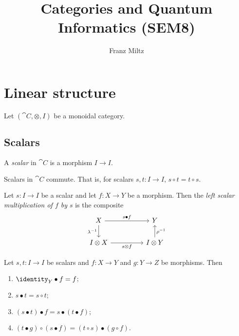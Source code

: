 \documentclass{article}
\begin{document}
\mkthmstwounified
\title{Categories and Quantum Informatics (SEM8)}
\author{Franz Miltz}

\maketitle

\tableofcontents

\pagebreak

\section{Linear structure}

Let $(\cat{C}, \otimes, I)$ be a monoidal category.

\subsection{Scalars}

\begin{definition}
  A \emph{scalar} in $\cat{C}$ is a morphism $I\to I$.
\end{definition}

\begin{lemma}
  Scalars in $\cat{C}$ commute. That is, for scalars $s,t:I\to I$, $s\circ t = t\circ s$.
\end{lemma}

\begin{definition}
  Let $s:I\to I$ be a scalar and let $f:X\to Y$ be a morphism. Then the \emph{left scalar
  multiplication of $f$ by $s$} is the composite
  \begin{equation}
    \begin{tikzcd}
      X && Y \\
      {I\otimes X} && {I\otimes Y}
      \arrow["{s\otimes f}"', from=2-1, to=2-3]
      \arrow["{\lambda^{-1}}"', from=1-1, to=2-1]
      \arrow["{\rho^{-1}}"', from=2-3, to=1-3]
      \arrow["{s\bullet f}", from=1-1, to=1-3]
    \end{tikzcd}
  \end{equation}
\end{definition}

\begin{lemma}
  Let $s,t:I\to I$ be scalars and $f:X\to Y$ and $g:Y\to Z$ be morphisms. Then
  \begin{enumerate}
    \item $\identity_Y\bullet f = f$;
    \item $s\bullet t = s\circ t$;
    \item $(s\bullet t)\bullet f = s\bullet (t\bullet f)$;
    \item $(t\bullet g)\circ(s\bullet f) = (t\circ s)\bullet (g\circ f)$.
  \end{enumerate}
\end{lemma}
\end{document}
